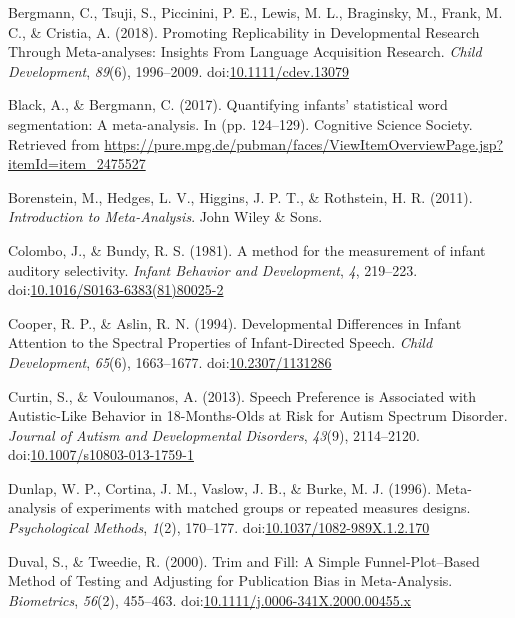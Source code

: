 \documentclass[man,floatsintext]{apa6}
\begin{document}
\hypertarget{ref-bergmann_promoting_2018}{}
Bergmann, C., Tsuji, S., Piccinini, P. E., Lewis, M. L., Braginsky, M.,
Frank, M. C., \& Cristia, A. (2018). Promoting Replicability in
Developmental Research Through Meta-analyses: Insights From Language
Acquisition Research. \emph{Child Development}, \emph{89}(6),
1996--2009.
doi:\href{https://doi.org/10.1111/cdev.13079}{10.1111/cdev.13079}

\hypertarget{ref-black_quantifying_2017}{}
Black, A., \& Bergmann, C. (2017). Quantifying infants' statistical word
segmentation: A meta-analysis. In (pp. 124--129). Cognitive Science
Society. Retrieved from
\url{https://pure.mpg.de/pubman/faces/ViewItemOverviewPage.jsp?itemId=item_2475527}

\hypertarget{ref-borenstein_introduction_2011}{}
Borenstein, M., Hedges, L. V., Higgins, J. P. T., \& Rothstein, H. R.
(2011). \emph{Introduction to Meta-Analysis}. John Wiley \& Sons.

\hypertarget{ref-colombo_method_1981}{}
Colombo, J., \& Bundy, R. S. (1981). A method for the measurement of
infant auditory selectivity. \emph{Infant Behavior and Development},
\emph{4}, 219--223.
doi:\href{https://doi.org/10.1016/S0163-6383(81)80025-2}{10.1016/S0163-6383(81)80025-2}

\hypertarget{ref-cooper_developmental_1994}{}
Cooper, R. P., \& Aslin, R. N. (1994). Developmental Differences in
Infant Attention to the Spectral Properties of Infant-Directed Speech.
\emph{Child Development}, \emph{65}(6), 1663--1677.
doi:\href{https://doi.org/10.2307/1131286}{10.2307/1131286}

\hypertarget{ref-curtin_speech_2013}{}
Curtin, S., \& Vouloumanos, A. (2013). Speech Preference is Associated
with Autistic-Like Behavior in 18-Months-Olds at Risk for Autism
Spectrum Disorder. \emph{Journal of Autism and Developmental Disorders},
\emph{43}(9), 2114--2120.
doi:\href{https://doi.org/10.1007/s10803-013-1759-1}{10.1007/s10803-013-1759-1}

\hypertarget{ref-dunlap_meta-analysis_1996}{}
Dunlap, W. P., Cortina, J. M., Vaslow, J. B., \& Burke, M. J. (1996).
Meta-analysis of experiments with matched groups or repeated measures
designs. \emph{Psychological Methods}, \emph{1}(2), 170--177.
doi:\href{https://doi.org/10.1037/1082-989X.1.2.170}{10.1037/1082-989X.1.2.170}

\hypertarget{ref-duval_trim_2000}{}
Duval, S., \& Tweedie, R. (2000). Trim and Fill: A Simple
Funnel-Plot--Based Method of Testing and Adjusting for Publication Bias
in Meta-Analysis. \emph{Biometrics}, \emph{56}(2), 455--463.
doi:\href{https://doi.org/10.1111/j.0006-341X.2000.00455.x}{10.1111/j.0006-341X.2000.00455.x}
\end{document}
